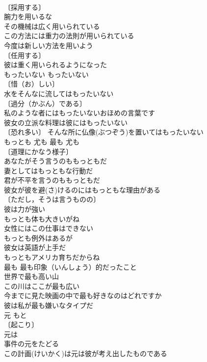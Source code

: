 \documentclass[8pt]{extreport}
\begin{document}
\begin{CJK}{UTF8}{min}
\\	〔採用する〕
\\	腕力を用いるな 
\\	その機械は広く用いられている 
\\	この方法には重力の法則が用いられている 
\\	今度は新しい方法を用いよう 
\\	〔任用する〕 
\\	彼は重く用いられるようになった 
\\	もったいない	もったいない	
\\	〔惜（お）しい〕
\\	水をそんなに流してはもったいない 
\\	〔過分（かぶん）である〕　
\\	私のような者にはもったいないおほめの言葉です 
\\	彼女の立派な料理は彼にはもったいない 
\\	〔恐れ多い〕 そんな所に仏像(ぶつぞう)を置いてはもったいない 
\\	もっとも	尤も 最も	尤も 
\\	〔道理にかなう様子〕　
\\	あなたがそう言うのももっともだ 
\\	妻としてはもっともな行動だ 
\\	君が不平を言うのももっともだ 
\\	彼女が彼を避(さ)けるのにはもっともな理由がある 
\\	〔ただし，そうは言うものの〕　
\\	彼は力が強い
\\	もっとも体も大きいがね 
\\	女性にはこの仕事はできない
\\	もっとも例外はあるが 
\\	彼女は英語が上手だ
\\	もっともアメリカ育ちだからね 
\\	最も 最も印象（いんしょう）的だったこと 
\\	世界で最も高い山 
\\	この川はここが最も広い 
\\	今までに見た映画の中で最も好きなのはどれですか 
\\	彼は私が最も嫌いなタイプだ 
\\	元	もと	
\\	〔起こり〕
\\	元は 
\\	事件の元をたどる 
\\	この計画(けいかく)は元は彼が考え出したものである 

\end{CJK}
\end{document}
